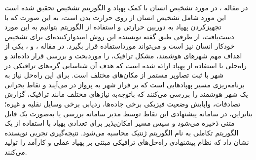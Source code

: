 در مقاله \cite{Kannadaguli2020}،  در مورد تشخیص انسان با کمک پهپاد و الگوریتم تشخیص  تحقیق شده است این مورد شامل تشخیص انسان از روی حرارت بدن است، به این صورت که با تجهیزکردن پهپاد به دوربین حرارتی و استفاده از الگوریتم  بتوانیم به این مورد دست‌یافت، از طرفی طبق گفته نویسنده این روش امیدوارکننده‌ای برای تشخیص خودکار انسان نیز است و می‌تواند مورداستفاده قرار بگیرد.
در مقاله \cite{Yilmaz2020}،  و ، یکی از اهداف مهم شهرهای هوشمند، مشکل ترافیک، را موردبحث و بررسی قرار داده‌اند و راه‌حلی با استفاده از پهپاد ارائه شده است که هدف آن شناسایی گره‌های ترافیکی در شهر با ثبت تصاویر مستمر از مکان‌های مختلف است. برای این راه‌حل نیاز به برنامه‌ریزی مسیر پهپادهایی است که بر فراز شهر به پرواز در می‌آیند و نقاط بحرانی یک شهر هوشمند را بررسی می‌کنند که باتوجه‌به نیازهای مختلف مانند ترافیک، گزارش تصادفات، واپایش وضعیت فیزیکی برخی جاده‌ها، ردیابی برخی وسایل نقلیه و غیره؛ بنابراین، در سامانه پیشنهادی این نقاط توسط مدیر سامانه بررسی یا به‌صورت یک فایل متنی ذخیره می‌شود و سپس مسیر امکان‌پذیر برای تعدادی پهپاد با استفاده از یک الگوریتم تکاملی به نام الگوریتم ژنتیک محاسبه می‌شود. نتیجه‌گیری تجربی نویسنده نشان داد که نظام پیشنهادی راه‌حل‌های ترافیکی مبتنی بر پهپاد عملی و کارآمد را تولید می‌کنند.
